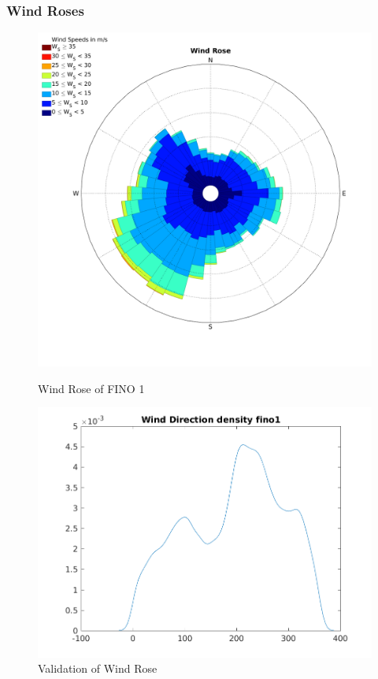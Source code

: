 \documentclass[12pt,t]{beamer}
\begin{document}
\begin{frame}
	\frametitle{Wind Roses}
\begin{figure}[htbp]
	\begin{center}
		\begin{minipage}[t]{0.4\linewidth}
			\centering
			\includegraphics[width=\linewidth]{../../figures/WindRose_Fino1.png}
			\caption{Wind Rose of FINO 1}
			\label{label 1}
		\end{minipage}
		\qquad
		\pause
		\begin{minipage}[t]{0.45\linewidth}
			\centering
			\includegraphics[width=\linewidth]{../../figures/Validation_WindRose_Fino1.png}
			\caption{Validation of Wind Rose}
			\label{label 2}
		\end{minipage}
	\end{center}
\end{figure}
\end{frame}
\end{document}
